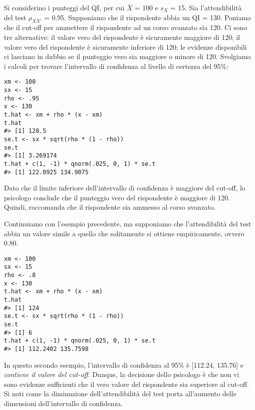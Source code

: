 %
%
%


\begin{exmp}
Si considerino i punteggi del QI, per cui $\bar{X}$ = 100 e $s_X$ = 15.  Sia l'attendibilità del test $\rho_{XX'}$ = 0.95.  
 Supponiamo che il rispondente abbia un QI = 130.   
 Poniamo che il cut-off per ammettere il rispondente ad un corso avanzato sia
120.
 Ci sono tre alternative:
il valore vero del rispondente è sicuramente maggiore di 120;
 il valore vero del rispondente è sicuramente inferiore di 120;
 le evidenze disponibili ci lasciano in dubbio se il punteggio
  vero sia maggiore o minore di 120.
Svolgiamo i calcoli per trovare l'intervallo di confidenza al
  livello di certezza del 95\%:
\begin{lstlisting} 
xm <- 100
sx <- 15
rho <- .95
x <- 130
t.hat <- xm + rho * (x - xm)
t.hat
#> [1] 128.5
se.t <- sx * sqrt(rho * (1 - rho))
se.t
#> [1] 3.269174
t.hat + c(1, -1) * qnorm(.025, 0, 1) * se.t
#> [1] 122.0925 134.9075
\end{lstlisting}
Dato che il limite inferiore
  dell'intervallo di confidenza è maggiore del cut-off, lo psicologo
  conclude che il punteggio vero del rispondente è maggiore di 120.
 Quindi, raccomanda che il rispondente sia ammesso al corso avanzato.

Continuiamo con l'esempio precedente, ma supponiamo che
  l'attendibilità del test abbia un valore simile a
  quello che solitamente si ottiene empiricamente, ovvero
  0.80. 
\begin{lstlisting} 
xm <- 100
sx <- 15
rho <- .8
x <- 130
t.hat <- xm + rho * (x - xm)
t.hat
#> [1] 124
se.t <- sx * sqrt(rho * (1 - rho))
se.t
#> [1] 6
t.hat + c(1, -1) * qnorm(.025, 0, 1) * se.t
#> [1] 112.2402 135.7598
\end{lstlisting}
In questo secondo esempio, l'intervallo di confidenza al 95\% è [112.24, 135.76] e
  \textit{contiene il valore del cut-off}.  
Dunque, la decisione dello psicologo è che non vi sono evidenze sufficienti che il  vero valore del rispondente sia superiore al cut-off. Si noti come la diminuzione dell’attendibilità del test porta all'aumento delle dimensioni dell’intervallo di confidenza. 
\end{exmp}


